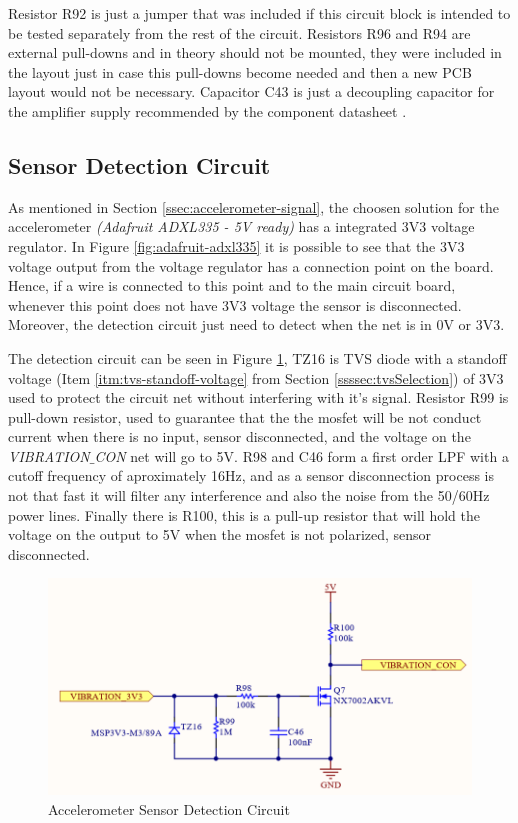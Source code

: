 	Resistor R92 is just a jumper that was included if this circuit block is intended to be tested separately from the rest of the circuit. Resistors R96 and R94 are external pull-downs and in theory should not be mounted, they were included in the layout just in case this pull-downs become needed and then a new PCB layout would not be necessary. Capacitor C43 is just a decoupling capacitor for the amplifier supply recommended by the component datasheet \cite{mcp6001-datasheet}.

\subsection{Sensor Detection Circuit}\label{ssec:accelerometer-sensor-detection-circuit}

	As mentioned in Section \ref{ssec:accelerometer-signal}, the choosen solution for the accelerometer \textit{(Adafruit ADXL335 - 5V ready)} has a integrated 3V3 voltage regulator. In Figure \ref{fig:adafruit-adxl335} it is possible to see that the 3V3 voltage output from the voltage regulator has a connection point on the board. Hence, if a wire is connected to this point and to the main circuit board, whenever this point does not have 3V3 voltage the sensor is disconnected. Moreover, the detection circuit just need to detect when the net is in 0V or 3V3.
	\par
	The detection circuit can be seen in Figure \ref{fig:accelerometer-sensor-detection-circuit}, TZ16 is TVS diode with a standoff voltage (Item \ref{itm:tvs-standoff-voltage} from Section \ref{ssssec:tvsSelection}) of 3V3 used to protect the circuit net without interfering with it's signal. Resistor R99 is pull-down resistor, used to guarantee that the the mosfet will be not conduct current when there is no input, sensor disconnected, and the voltage on the \textit{VIBRATION$\_$CON} net will go to 5V. R98 and C46 form a first order LPF with a cutoff frequency of aproximately 16Hz, and as a sensor disconnection process is not that fast it will filter any interference and also the noise from the 50/60Hz power lines. Finally there is R100, this is a pull-up resistor that will hold the voltage on the output to 5V when the mosfet is not polarized, sensor disconnected.

	\begin{figure}[htbp]
		\centering
			\includegraphics[scale=1.5]{figuras/fig-accelerometer-sensor-detection-circuit.png}
		\caption{Accelerometer Sensor Detection Circuit \cite{accelerometer-sensor-detection-circuit}}
		\label{fig:accelerometer-sensor-detection-circuit}
	\end{figure}